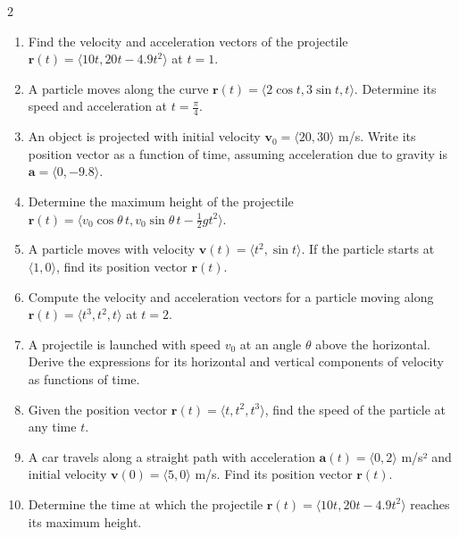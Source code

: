 \begin{multicols}{2}
\begin{enumerate}
    \item Find the velocity and acceleration vectors of the projectile \( \mathbf{r}(t) = \langle 10t, 20t - 4.9t^2 \rangle \) at \( t = 1 \).
    \item A particle moves along the curve \( \mathbf{r}(t) = \langle 2\cos t, 3\sin t, t \rangle \). Determine its speed and acceleration at \( t = \frac{\pi}{4} \).
    \item An object is projected with initial velocity \( \mathbf{v}_0 = \langle 20, 30 \rangle \) m/s. Write its position vector as a function of time, assuming acceleration due to gravity is \( \mathbf{a} = \langle 0, -9.8 \rangle \).
    \item Determine the maximum height of the projectile \( \mathbf{r}(t) = \langle v_0 \cos \theta \, t, v_0 \sin \theta \, t - \frac{1}{2} g t^2 \rangle \).
    \item A particle moves with velocity \( \mathbf{v}(t) = \langle t^2, \sin t \rangle \). If the particle starts at \( \langle 1, 0 \rangle \), find its position vector \( \mathbf{r}(t) \).
    \item Compute the velocity and acceleration vectors for a particle moving along \( \mathbf{r}(t) = \langle t^3, t^2, t \rangle \) at \( t = 2 \).
    \item A projectile is launched with speed \( v_0 \) at an angle \( \theta \) above the horizontal. Derive the expressions for its horizontal and vertical components of velocity as functions of time.
    \item Given the position vector \( \mathbf{r}(t) = \langle t, t^2, t^3 \rangle \), find the speed of the particle at any time \( t \).
    \item A car travels along a straight path with acceleration \( \mathbf{a}(t) = \langle 0, 2 \rangle \) m/s² and initial velocity \( \mathbf{v}(0) = \langle 5, 0 \rangle \) m/s. Find its position vector \( \mathbf{r}(t) \).
    \item Determine the time at which the projectile \( \mathbf{r}(t) = \langle 10 t, 20 t - 4.9 t^2 \rangle \) reaches its maximum height.


\end{enumerate}
\end{multicols}
